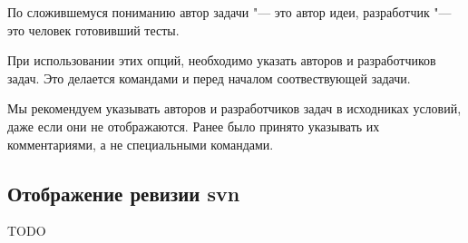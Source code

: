 \documentclass[11pt,a4paper,oneside]{article}
\begin{document}
По сложившемуся пониманию автор задачи "--- это автор идеи, разработчик "--- это
человек готовивший тесты.

При использовании этих опций, необходимо указать авторов и разработчиков задач.
Это делается командами \unskip{}
и \unskip{} перед началом соотвествующей
задачи.

Мы рекомендуем указывать авторов и разработчиков задач в исходниках условий, даже если
они не отображаются. Ранее было принято указывать их комментариями, а не специальными командами.

\subsection{Отображение ревизии svn}


TODO
\end{document}
